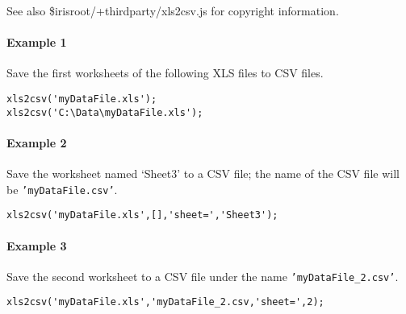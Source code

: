 See also \$irisroot/+thirdparty/xls2csv.js for copyright information.

\paragraph{Example 1}\label{example-1}

Save the first worksheets of the following XLS files to CSV files.

\begin{verbatim}
xls2csv('myDataFile.xls');
xls2csv('C:\Data\myDataFile.xls');
\end{verbatim}

\paragraph{Example 2}\label{example-2}

Save the worksheet named `Sheet3' to a CSV file; the name of the CSV
file will be \texttt{'myDataFile.csv'}.

\begin{verbatim}
xls2csv('myDataFile.xls',[],'sheet=','Sheet3');
\end{verbatim}

\paragraph{Example 3}\label{example-3}

Save the second worksheet to a CSV file under the name
\texttt{'myDataFile\_2.csv'}.

\begin{verbatim}
xls2csv('myDataFile.xls','myDataFile_2.csv,'sheet=',2);
\end{verbatim}


